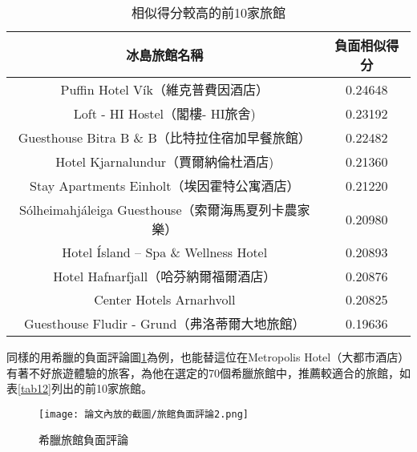 	\begin{table}[H]
	\centering
	\caption{相似得分較高的前10家旅館}
	\begin{tabular}{|c|c|}
	\toprule
	冰島旅館名稱 & 負面相似得分 \\
	\midrule
	Puffin Hotel Vík（維克普費因酒店） & 0.24648  \\
	\midrule
	Loft - HI Hostel（閣樓- HI旅舍) & 0.23192 \\
	\midrule
	Guesthouse Bitra B \& B（比特拉住宿加早餐旅館） & 0.22482 \\
	\midrule
	Hotel Kjarnalundur（賈爾納倫杜酒店) &  0.21360 \\
	\midrule
	Stay Apartments Einholt（埃因霍特公寓酒店） &  0.21220 \\
	\midrule
	Sólheimahjáleiga Guesthouse（索爾海馬夏列卡農家樂） &  0.20980 \\
	\midrule
	Hotel Ísland – Spa \& Wellness Hotel & 0.20893 \\
	\midrule
	Hotel Hafnarfjall（哈芬納爾福爾酒店） &0.20876 \\
	\midrule
	Center Hotels Arnarhvoll & 0.20825 \\
	\midrule
	Guesthouse Fludir - Grund（弗洛蒂爾大地旅館） & 0.19636 \\
	\bottomrule
	\end{tabular}
	\label{tab11}
	\end{table}
	
\newpage

	同樣的用希臘的負面評論圖\ref{Fig10}為例，也能替這位在Metropolis Hotel（大都市酒店）有著不好旅遊體驗的旅客，為他在選定的70個希臘旅館中，推薦較適合的旅館，如表\ref{tab12}列出的前10家旅館。\\
	
	\begin{figure}[H]
	\centering
	\texttt{[image: 論文內放的截圖/旅館負面評論2.png]}
	\caption{希臘旅館負面評論}
	\label{Fig10}
	\end{figure}
	
